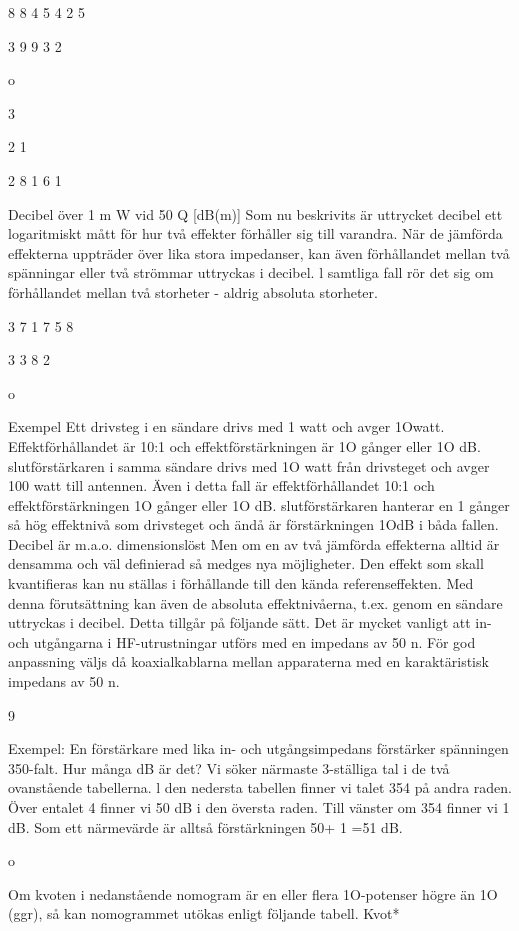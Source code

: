 \documentclass[a4paper,twoside,twocolumn,openright]{book}
\begin{document}
{{{{{{{{{{{{{8
8
4
5
4
2
5

3
9
9
3
2

o

3

2
1

2
8
1
6
1

Decibel över 1 m W vid 50 Q [dB(m)]
Som nu beskrivits är uttrycket decibel ett
logaritmiskt mått för hur två effekter förhåller
sig till varandra. När de jämförda effekterna
uppträder över lika stora impedanser, kan
även förhållandet mellan två spänningar eller två strömmar uttryckas i decibel. l samtliga fall rör det sig om förhållandet mellan två
storheter - aldrig absoluta storheter.

3
7
1
7
5
8

3
3
8
2

o

Exempel
Ett drivsteg i en sändare drivs med 1 watt och
avger 1Owatt. Effektförhållandet är 10:1 och
effektförstärkningen är 1O gånger eller 1O
dB. slutförstärkaren i samma sändare drivs
med 1O watt från drivsteget och avger 100
watt till antennen. Även i detta fall är effektförhållandet 10:1 och effektförstärkningen
1O gånger eller 1O dB.
slutförstärkaren hanterar en 1 gånger
så hög effektnivå som drivsteget och ändå är
förstärkningen 1OdB i båda fallen. Decibel är
m.a.o. dimensionslöst
Men om en av två jämförda effekterna
alltid är densamma och väl definierad så
medges nya möjligheter. Den effekt som
skall kvantifieras kan nu ställas i förhållande
till den kända referenseffekten. Med denna
förutsättning kan även de absoluta effektnivåerna, t.ex. genom en sändare uttryckas
i decibel. Detta tillgår på följande sätt.
Det är mycket vanligt att in- och utgångarna i HF-utrustningar utförs med en impedans av 50 n. För god anpassning väljs
då koaxialkablarna mellan apparaterna med
en karaktäristisk impedans av 50 n.

9

Exempel:
En förstärkare med lika in- och utgångsimpedans förstärker spänningen 350-falt.
Hur många dB är det?
Vi söker närmaste 3-ställiga tal i de två
ovanstående tabellerna. l den nedersta tabellen finner vi talet 354 på andra raden.
Över entalet 4 finner vi 50 dB i den översta
raden. Till vänster om 354 finner vi 1 dB.
Som ett närmevärde är alltså förstärkningen
50+ 1 =51 dB.

o

Om kvoten i nedanstående nomogram är en
eller flera 1O-potenser högre än 1O (ggr), så
kan nomogrammet utökas enligt följande
tabell.
Kvot*

}}}}}}}}}}}}}
\end{document}
